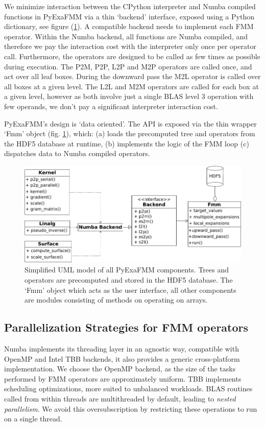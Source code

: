 \documentclass{IEEEcsmag}
\begin{document}
We minimize interaction between the CPython interpreter and Numba compiled functions in PyExaFMM via a thin `backend' interface, exposed using a Python dictionary, see figure (\ref{fig:design}). A compatible backend needs to implement each FMM operator. Within the Numba backend, all functions are Numba compiled, and therefore we pay the interaction cost with the interpreter only once per operator call. Furthermore, the operators are designed to be called as few times as possible during execution. The P2M, P2P, L2P and M2P operators are called once, and act over all leaf boxes. During the downward pass the M2L operator is called over all boxes at a given level. The L2L and M2M operators are called for each box at a given level, however as both involve just a single BLAS level 3 operation with few operands, we don't pay a significant interpreter interaction cost.

PyExaFMM's design is `data oriented'. The API is exposed via the thin wrapper `Fmm' object (fig. \ref{fig:design}), which: (a) loads the precomputed tree and operators from the HDF5 database at runtime, (b) implements the logic of the FMM loop (c) dispatches data to Numba compiled operators.

\begin{figure}
	\centerline{\includegraphics {figures/software.pdf}}
	\caption{Simplified UML model of all PyExaFMM components. Trees and operators are precomputed and stored in the HDF5 database. The `Fmm' object which acts as the user interface, all other components are modules consisting of methods on operating on arrays.}
	\label{fig:design}
\end{figure}

\subsection{Parallelization Strategies for FMM operators}

Numba implements its threading layer in an agnostic way, compatible with OpenMP and Intel TBB backends, it also provides a generic cross-platform implementation. We choose the OpenMP backend, as the size of the tasks performed by FMM operators are approximately uniform. TBB implements scheduling optimizations, more suited to unbalanced workloads. BLAS routines called from within threads are multithreaded by default, leading to \textit{nested parallelism}. We avoid this oversubscription by restricting these operations to run on a single thread.
\end{document}
